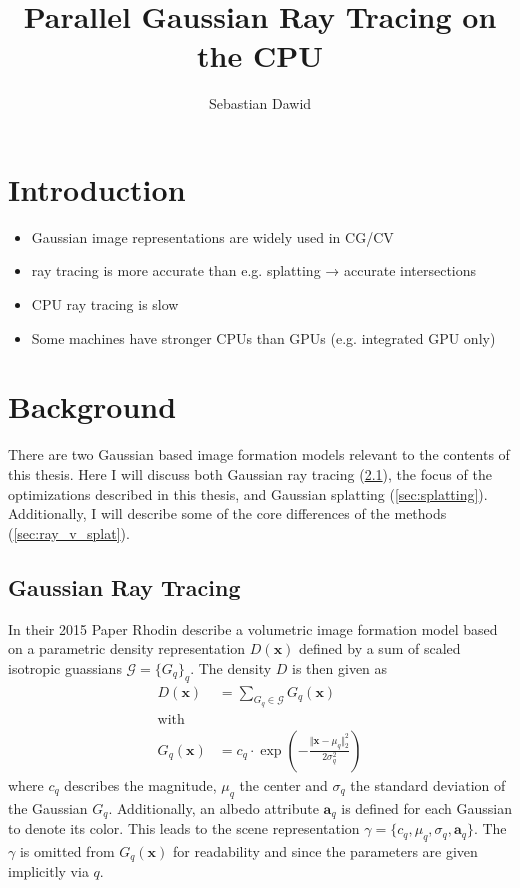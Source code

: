 \documentclass[a4paper, 11pt]{memoir}
\title{Parallel Gaussian Ray Tracing on the CPU}
\author{Sebastian Dawid}
\begin{document}
    \frontmatter
    \smarttitle
    \newpage
    \tableofcontents*

    \clearpage
    \thispagestyle{abs}
    \abstractintoc
    \begin{abstract}
        \lipsum[1]
    \end{abstract}

    \mainmatter
    \chapter{Introduction}
    \begin{itemize}
        \item Gaussian image representations are widely used in CG/CV
        \item ray tracing is more accurate than e.g. splatting →  accurate intersections
        \item CPU ray tracing is slow
        \item Some machines have stronger CPUs than GPUs (e.g. integrated GPU only)
    \end{itemize}

    \chapter{Background}
    \label{ch:background}
    There are two Gaussian based image formation models relevant to the contents of this thesis. Here I will discuss both
    Gaussian ray tracing (\ref{sec:int_grt}), the focus of the optimizations described in this thesis, and Gaussian
    splatting (\ref{sec:splatting}). Additionally, I will describe some of the core differences of the methods (\ref{sec:ray_v_splat}).

    \section{Gaussian Ray Tracing}
    \label{sec:int_grt}
    In their 2015 Paper  \cite{Rhodin:2015} Rhodin \etal describe a volumetric image formation
    model based on a parametric density representation $D(\mathbf{x})$ defined by a sum of scaled isotropic guassians
    $\mathcal{G} = \{ G_q \}_q$. The density $D$ is then given as
    \begin{align}
        D(\mathbf{x}) &= \sum_{G_q \in \mathcal{G}} G_q(\mathbf{x})
        \label{eq:density}\\
        \text{with} \nonumber\\
        G_q(\mathbf{x}) &= c_q \cdot \exp{\left( - \frac{\Vert\mathbf{x} - \mu_q\Vert_2^2}{2\sigma_q^2} \right)}
        \label{eq:gaussian}
    \end{align}
    where $c_q$ describes the magnitude, $\mu_q$ the center and $\sigma_q$ the standard deviation of the Gaussian $G_q$.
    Additionally, an \gls{albedo} attribute $\mathbf{a}_q$ is defined for each Gaussian to denote its color. This leads
    to the scene representation $\gamma = \{ c_q, \mu_q, \sigma_q, \mathbf{a}_q \}$. The $\gamma$ is omitted from
    $G_q(\mathbf{x})$ for readability and since the parameters are given implicitly via $q$.
\end{document}
